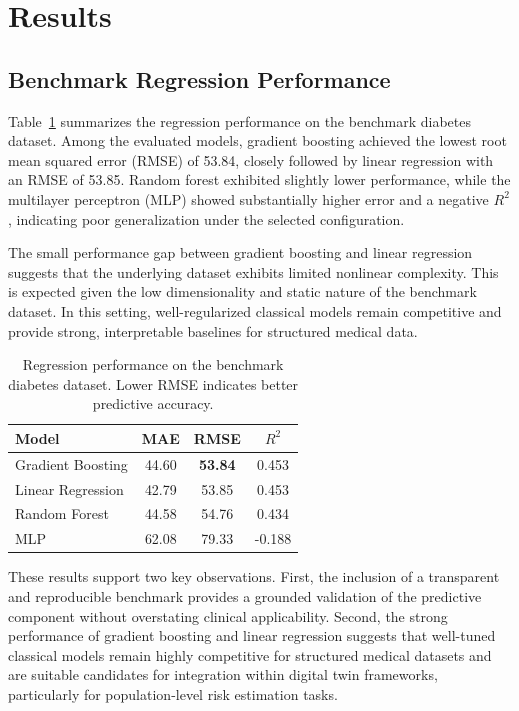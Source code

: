 \documentclass[journal]{IEEEtran}
\begin{document}
\section{Results}
\subsection{Benchmark Regression Performance}
Table~\ref{tab:regression} summarizes the regression performance on the benchmark diabetes dataset. Among the evaluated models, gradient boosting achieved the lowest root mean squared error (RMSE) of 53.84, closely followed by linear regression with an RMSE of 53.85. Random forest exhibited slightly lower performance, while the multilayer perceptron (MLP) showed substantially higher error and a negative $R^2$, indicating poor generalization under the selected configuration.

The small performance gap between gradient boosting and linear regression suggests that the underlying dataset exhibits limited nonlinear complexity. This is expected given the low dimensionality and static nature of the benchmark dataset. In this setting, well-regularized classical models remain competitive and provide strong, interpretable baselines for structured medical data.

\begin{table}[htbp]
\centering
\renewcommand{\arraystretch}{1.15}
\setlength{\tabcolsep}{5pt}
\begin{tabular}{>{\raggedright\arraybackslash}p{3.1cm}ccc}
\toprule
\rowcolor{headerblue}
\textbf{Model} & \textbf{MAE} & \textbf{RMSE} & \textbf{$R^2$} \\
\midrule
Gradient Boosting & 44.60 & \textbf{53.84} & 0.453 \\
Linear Regression & 42.79 & 53.85 & 0.453 \\
Random Forest & 44.58 & 54.76 & 0.434 \\
MLP & 62.08 & 79.33 & -0.188 \\
\bottomrule
\end{tabular}
\caption{Regression performance on the benchmark diabetes dataset. Lower RMSE indicates better predictive accuracy.}
\label{tab:regression}
\end{table}

These results support two key observations. First, the inclusion of a transparent and reproducible benchmark provides a grounded validation of the predictive component without overstating clinical applicability. Second, the strong performance of gradient boosting and linear regression suggests that well-tuned classical models remain highly competitive for structured medical datasets and are suitable candidates for integration within digital twin frameworks, particularly for population-level risk estimation tasks.
\end{document}
